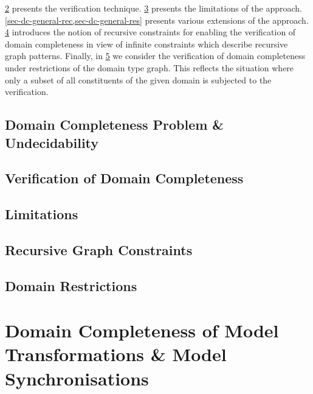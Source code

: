 \documentclass{eceasst}
\begin{document}
\cref{sec-dc-verification} presents the verification technique.
\cref{sec-dc-general-lim} presents the limitations of the approach.
\cref{sec-dc-general-rec,sec-dc-general-res} presents various extensions of the approach.
\cref{sec-dc-general-rec} introduces the notion of recursive constraints for enabling the verification of domain completeness in view of infinite constraints which describe recursive graph patterns.
Finally, in \cref{sec-dc-general-res} we consider the verification of domain completeness under restrictions of the domain type graph.
This reflects the situation where only a subset of all constituents of the given domain is subjected to the verification.

\section{Domain Completeness Problem \& Undecidability}
\label{sec-dc-general}


\section{Verification of Domain Completeness}
\label{sec-dc-verification}


\section{Limitations}
\label{sec-dc-general-lim}


\section{Recursive Graph Constraints}
\label{sec-dc-general-rec}


\section{Domain Restrictions}
\label{sec-dc-general-res}


\chapter{Domain Completeness of Model Transformations \& Model Synchronisations}
\label{sec-dom-compl-mt-synch}
\end{document}
